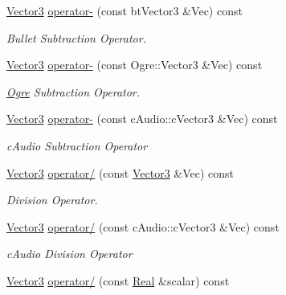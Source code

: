 \begin{DoxyCompactItemize}
\hyperlink{classMezzanine_1_1Vector3}{Vector3} \hyperlink{classMezzanine_1_1Vector3_a9306b274042f67be5023fad08e95ce44}{operator-\/} (const btVector3 \&Vec) const 
\begin{DoxyCompactList}\small\item\em Bullet Subtraction Operator. \item\end{DoxyCompactList}\item 
\hyperlink{classMezzanine_1_1Vector3}{Vector3} \hyperlink{classMezzanine_1_1Vector3_ad59d3f710c34350111076c7f0392a084}{operator-\/} (const Ogre::Vector3 \&Vec) const 
\begin{DoxyCompactList}\small\item\em \hyperlink{namespaceOgre}{Ogre} Subtraction Operator. \item\end{DoxyCompactList}\item 
\hyperlink{classMezzanine_1_1Vector3}{Vector3} \hyperlink{classMezzanine_1_1Vector3_a538da2943b8c8a3dd7a6e60212fa244c}{operator-\/} (const cAudio::cVector3 \&Vec) const 
\begin{DoxyCompactList}\small\item\em cAudio Subtraction Operator \item\end{DoxyCompactList}\item 
\hyperlink{classMezzanine_1_1Vector3}{Vector3} \hyperlink{classMezzanine_1_1Vector3_a18fdcebbb90b2e489d9f35d45ce6d808}{operator/} (const \hyperlink{classMezzanine_1_1Vector3}{Vector3} \&Vec) const 
\begin{DoxyCompactList}\small\item\em Division Operator. \item\end{DoxyCompactList}\item 
\hyperlink{classMezzanine_1_1Vector3}{Vector3} \hyperlink{classMezzanine_1_1Vector3_a2a7b3c5d709832b532b2259e87a42efe}{operator/} (const cAudio::cVector3 \&Vec) const 
\begin{DoxyCompactList}\small\item\em cAudio Division Operator \item\end{DoxyCompactList}\item 
\hyperlink{classMezzanine_1_1Vector3}{Vector3} \hyperlink{classMezzanine_1_1Vector3_a35627082486d972f282597c49eb75692}{operator/} (const \hyperlink{namespaceMezzanine_a726731b1a7df72bf3583e4a97282c6f6}{Real} \&scalar) const 

\end{DoxyCompactItemize}
